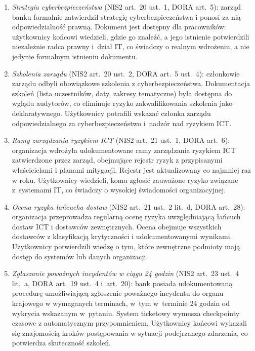 \begin{enumerate}[label=(\roman*)]
  \item \textit{Strategia cyberbezpieczeństwa} (NIS2 art.~20 ust.~1, DORA art.~5): zarząd banku formalnie zatwierdził strategię cyberbezpieczeństwa i ponosi za nią odpowiedzialność prawną. Dokument jest dostępny dla pracowników: użytkownicy końcowi wiedzieli, gdzie go znaleźć, a jego istnienie potwierdzili niezależnie radca prawny i~dział IT, co świadczy o realnym wdrożeniu, a nie jedynie formalnym istnieniu dokumentu.

  \item \textit{Szkolenia zarządu} (NIS2 art.~20 ust.~2, DORA art.~5 ust.~4): członkowie zarządu odbyli obowiązkowe szkolenia z cyberbezpieczeństwa. Dokumentacja szkoleń (lista uczestników, daty, zakresy tematyczne) była dostępna do wglądu audytorów, co eliminuje ryzyko zakwalifikowania szkolenia jako deklaratywnego. Użytkownicy potrafili wskazać członka zarządu odpowiedzialnego za cyberbezpieczeństwo i~nadzór nad ryzykiem ICT.

  \item \textit{Ramy zarządzania ryzykiem ICT} (NIS2 art.~21 ust.~1, DORA art.~6): organizacja wdrożyła udokumentowane ramy zarządzania ryzykiem ICT zatwierdzone przez zarząd, obejmujące rejestr ryzyk z przypisanymi właścicielami i planami mitygacji. Rejestr jest aktualizowany co najmniej raz w roku. Użytkownicy wiedzieli, komu zgłosić zauważone ryzyko związane z~systemami IT, co świadczy o wysokiej świadomości organizacyjnej.

  \item \textit{Ocena ryzyka łańcucha dostaw} (NIS2 art.~21 ust.~2 lit.~d, DORA art.~28): organizacja przeprowadza regularną ocenę ryzyka uwzględniającą łańcuch dostaw ICT i dostawców zewnętrznych. Ocena obejmuje wszystkich dostawców z klasyfikacją krytyczności i udokumentowanymi wynikami. Użytkownicy potwierdzili wiedzę o tym, które zewnętrzne podmioty mają dostęp do systemów lub danych organizacji.

  \item \textit{Zgłaszanie poważnych incydentów w ciągu 24 godzin} (NIS2 art.~23 ust.~4 lit.~a, DORA art.~19 ust.~4 i~art.~20): bank posiada udokumentowaną procedurę umożliwiającą zgłoszenie poważnego incydentu do organu krajowego w wymaganych terminach, w~tym w~terminie 24 godzin od wykrycia wskazanym w~pytaniu. System ticketowy wymusza checkpointy czasowe z automatycznym przypomnieniem. Użytkownicy końcowi wykazali się znajomością kroków postępowania w sytuacji podejrzanego zdarzenia, co potwierdza skuteczność szkoleń.


\end{enumerate}
